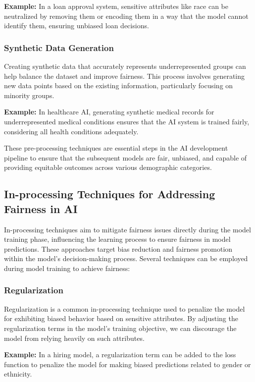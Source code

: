 \documentclass[12pt,a4paper,openright,twoside]{book}
\begin{document}
\textbf{Example:} In a loan approval system, sensitive attributes like race can be neutralized by removing them or encoding them in a way that the model cannot identify them, ensuring unbiased loan decisions.

\subsubsection{Synthetic Data Generation}
Creating synthetic data that accurately represents underrepresented groups can help balance the dataset and improve fairness. This process involves generating new data points based on the existing information, particularly focusing on minority groups.

\textbf{Example:} In healthcare AI, generating synthetic medical records for underrepresented medical conditions ensures that the AI system is trained fairly, considering all health conditions adequately.

These pre-processing techniques are essential steps in the AI development pipeline to ensure that the subsequent models are fair, unbiased, and capable of providing equitable outcomes across various demographic categories.

\subsection{In-processing Techniques for Addressing Fairness in AI}

In-processing techniques aim to mitigate fairness issues directly during the model training phase, influencing the learning process to ensure fairness in model predictions. These approaches target bias reduction and fairness promotion within the model's decision-making process. Several techniques can be employed during model training to achieve fairness:

\subsubsection{Regularization}
Regularization is a common in-processing technique used to penalize the model for exhibiting biased behavior based on sensitive attributes. By adjusting the regularization terms in the model's training objective, we can discourage the model from relying heavily on such attributes.

\textbf{Example:} In a hiring model, a regularization term can be added to the loss function to penalize the model for making biased predictions related to gender or ethnicity.
\end{document}
